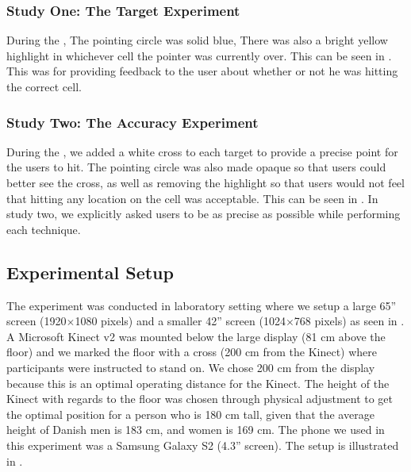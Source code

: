 \subsubsection{Study One: The Target Experiment} 
During the \target, The pointing circle was solid blue, 
There was also a bright yellow highlight in whichever cell the pointer was currently over.
This can be seen in .
This was for providing feedback to the user about whether or not he was hitting the correct cell. 

\subsubsection{Study Two: The Accuracy Experiment}
During the \accuracy, we added a white cross to each target to provide a precise point for the users to hit.
The pointing circle was also made opaque so that users could better see the cross, as well as removing the highlight so that users would not feel that hitting any location on the cell was acceptable.
This can be seen in .
In study two, we explicitly asked users to be as precise as possible while performing each technique.

\subsection{Experimental Setup} \label{sec:setup}
The experiment was conducted in laboratory setting where we setup a large 65'' screen (1920$\times$1080 pixels) and a smaller 42'' screen (1024$\times$768 pixels) as seen in .
A Microsoft Kinect v2 was mounted below the large display (81 cm above the floor) and we marked the floor with a cross (200 cm from the Kinect) where participants were instructed to stand on.
We chose 200 cm from the display because this is an optimal operating distance for the Kinect.
The height of the Kinect with regards to the floor was chosen through physical adjustment to get the optimal position for a person who is 180 cm tall, given that the average height of Danish men is 183 cm, and women is 169 cm. 
The phone we used in this experiment was a Samsung Galaxy S2 (4.3'' screen).
The setup is illustrated in .

